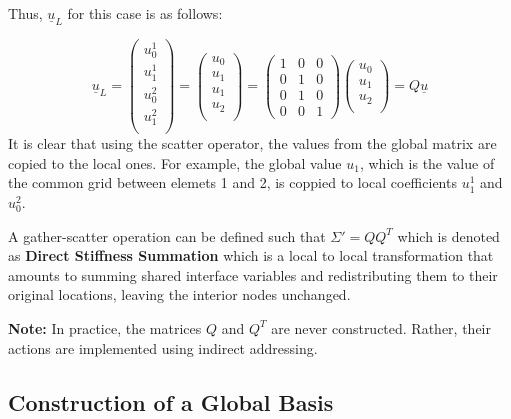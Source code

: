 \documentclass[
]{scrartcl}
\begin{document}
Thus, \(\underline{u}_L\) for this case is as follows:

\begin{equation}
    \underline{u}_L=
    \begin{pmatrix}
    {u}^{1}_{0} \\
    {u}^{1}_{1} \\
    {u}^{2}_{0} \\
    {u}^{2}_{1} \\
    \end{pmatrix}=
    \begin{pmatrix}
    {u}_{0} \\
    {u}_{1} \\
    {u}_{1} \\
    {u}_{2} \\
    \end{pmatrix}=
     \begin{pmatrix}
           1    &   0     &0 \\
           0    &    1    & 0\\
            0  &   1     & 0\\
            0   &    0    & 1
    \end{pmatrix} 
    \begin{pmatrix}
    {u}_{0} \\
    {u}_{1} \\
    {u}_{2} \\
    \end{pmatrix}=
    Q\underline{u}
\end{equation} It is clear that using the scatter operator, the values
from the global matrix are copied to the local ones. For example, the
global value \({u}_{1}\), which is the value of the common grid between
elemets 1 and 2, is coppied to local coefficients \({u}^{1}_{1}\) and
\({u}^{2}_{0}\).

A gather-scatter operation can be defined such that \(\Sigma'=QQ^{T}\)
which is denoted as \textbf{Direct Stiffness Summation} which is a local
to local transformation that amounts to summing shared interface
variables and redistributing them to their original locations, leaving
the interior nodes unchanged.

\textbf{Note:} In practice, the matrices \(Q\) and \(Q^T\) are never
constructed. Rather, their actions are implemented using indirect
addressing.

\hypertarget{construction-of-a-global-basis}{%
\subsection{Construction of a Global
Basis}\label{construction-of-a-global-basis}}
\end{document}

